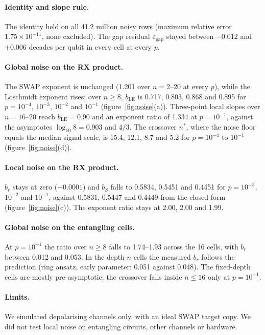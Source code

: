 \paragraph{Identity and slope rule.} The identity held on all 41.2 million noisy rows (maximum relative error
$1.75\times10^{-11}$, none excluded). The gap residual $\varepsilon_{\mathrm{gap}}$ stayed between $-0.012$ and
$+0.006$ decades per qubit in every cell at every $p$.

\paragraph{Global noise on the RX product.} The SWAP exponent is unchanged (1.201 over $n = 2$--$20$ at every $p$),
while the Loschmidt exponent rises: over $n \ge 8$, $b_{\mathrm{LE}}$ is 0.717, 0.803, 0.868 and 0.895 for
$p = 10^{-4}$, $10^{-3}$, $10^{-2}$ and $10^{-1}$ (figure~\ref{fig:noise}(a)). Three-point local slopes over
$n = 16$--$20$ reach $b_{\mathrm{LE}} = 0.90$ and an exponent ratio of 1.334 at $p = 10^{-1}$, against the
asymptotes $\log_{10}8 = 0.903$ and $4/3$. The crossover $n^*$, where the noise floor equals the median signal
scale, is 15.4, 12.1, 8.7 and 5.2 for $p = 10^{-4}$ to $10^{-1}$ (figure~\ref{fig:noise}(d)).

\paragraph{Local noise on the RX product.} $b_r$ stays at zero ($-0.0001$) and $b_S$ falls to 0.5834, 0.5451 and
0.4451 for $p = 10^{-3}$, $10^{-2}$ and $10^{-1}$, against 0.5831, 0.5447 and 0.4449 from the closed form
(figure~\ref{fig:noise}(c)). The exponent ratio stays at 2.00, 2.00 and 1.99.

\paragraph{Global noise on the entangling cells.} At $p = 10^{-1}$ the ratio over $n \ge 8$ falls to 1.74--1.93
across the 16 cells, with $b_r$ between 0.012 and 0.053. In the depth-$n$ cells the measured $b_r$ follows the
prediction (ring ansatz, early parameter: 0.051 against 0.048). The fixed-depth cells are mostly pre-asymptotic: the
crossover falls inside $n \le 16$ only at $p = 10^{-1}$.

\paragraph{Limits.} We simulated depolarising channels only, with an ideal SWAP target copy. We did not test local
noise on entangling circuits, other channels or hardware.
